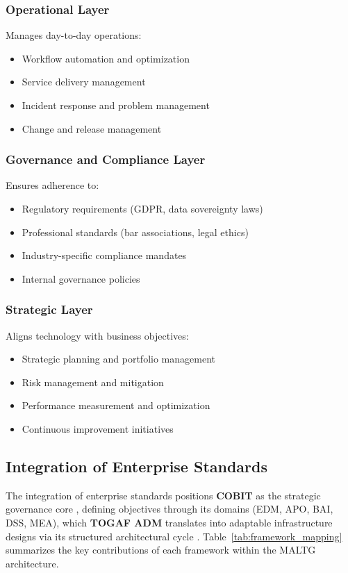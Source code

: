 \documentclass{IET-Conf-Paper}
\begin{document}
    \subsubsection{\textbf{Operational Layer}}
        Manages day-to-day operations:
        \begin{itemize}
        \item Workflow automation and optimization
        \item Service delivery management
        \item Incident response and problem management
        \item Change and release management
        \end{itemize}
        
    \subsubsection{\textbf{Governance and Compliance Layer}}
        Ensures adherence to:
        \begin{itemize}
        \item Regulatory requirements (GDPR, data sovereignty laws)
        \item Professional standards (bar associations, legal ethics)
        \item Industry-specific compliance mandates
        \item Internal governance policies
        \end{itemize}

    \subsubsection{\textbf{Strategic Layer}}
        Aligns technology with business objectives:
        \begin{itemize}
        \item Strategic planning and portfolio management
        \item Risk management and mitigation
        \item Performance measurement and optimization
        \item Continuous improvement initiatives
        \end{itemize}

    \subsection{Integration of Enterprise Standards}
        The integration of enterprise standards positions \textbf{COBIT} as the strategic governance core \cite{rusman2022information}, defining objectives through its domains (EDM, APO, BAI, DSS, MEA), which \textbf{TOGAF ADM} translates into adaptable infrastructure designs via its structured architectural cycle \cite{puspitasari2021enterprise}. Table~\ref{tab:framework_mapping} summarizes the key contributions of each framework within the MALTG architecture.
\end{document}
